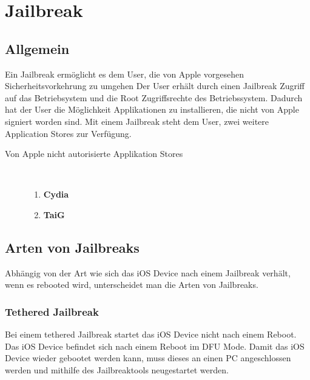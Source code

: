 %
%
% 
%
% 


\chapter{Jailbreak}
\label{ch:JB}

\section{Allgemein}
\label{sec:JBAllgemein}

Ein Jailbreak ermöglicht es dem User, die von Apple
vorgesehen Sicherheitsvorkehrung zu umgehen 
Der User erhält durch einen Jailbreak \glqq Zugriff\grqq{} auf das
Betriebsystem und die \glqq Root Zugriffsrechte \grqq{} des Betriebssystem.
Dadurch hat der User die Möglichkeit Applikationen zu installieren,
die nicht von Apple signiert worden sind. 
Mit einem Jailbreak steht dem User, zwei weitere \glqq Application Stores
\grqq{} zur Verfügung.

\begin{description}
\item[Von Apple nicht autorisierte \glqq Applikation Stores\grqq]~\par
	\begin{enumerate}
	   	\item \textbf{Cydia} \cite{Cydia[1]}
		\item \textbf{TaiG}
	\end{enumerate}
\end{description}

\section{Arten von Jailbreaks}
\label{sec:JBArten}
Abhängig von der Art wie sich das iOS Device nach einem Jailbreak verhält, wenn
es rebooted wird, unterscheidet man die Arten von Jailbreaks. 

\subsection{Tethered Jailbreak}
\label{sec:JBTethered}
Bei einem \glqq tethered Jailbreak\grqq{} startet das iOS Device nicht nach
einem Reboot. Das iOS Device befindet sich nach einem Reboot im DFU Mode.
Damit das iOS Device wieder gebootet werden kann, muss dieses an einen PC
angeschlossen werden und mithilfe des Jailbreaktools neugestartet werden.

